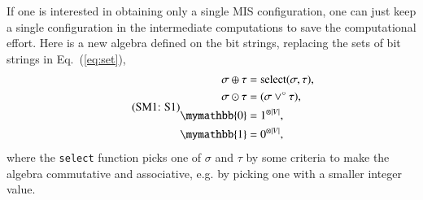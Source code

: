 \documentclass[onefignum, onetabnum]{siamart190516}
\newcommand{\eqname}[1]{\stepcounter{equation}\tag{\theequation : #1}}
\newcommand{\<}{\langle}
\renewcommand{\>}{\rangle}
\newcommand{\Eq}[1]{Eq.~(\ref{#1})}
\newcommand{\App}[1]{Appendix~\ref{#1}}
\begin{document}
If one is interested in obtaining only a single MIS configuration, one can just keep a single configuration in the intermediate computations to save the computational effort.
Here is a new algebra defined on the bit strings, replacing the sets of bit strings in \Eq{eq:set}, 
%
\begin{equation}
\eqname{S1}
\begin{split}
    \sigma \oplus \tau &= {\rm select}(\sigma, \tau), \\
    \sigma \odot \tau &= (\sigma\lor^\circ \tau),\\
    \mymathbb{0} &= 1^{\otimes |V|}, \\
    \mymathbb{1} &= 0^{\otimes |V|},
\end{split}\label{eq:singleconfig}
\end{equation}
where the \texttt{select} function picks one of $\sigma$ and $\tau$ by some criteria to make the algebra commutative and associative, e.g. by picking one with a smaller integer value.

\end{document}
